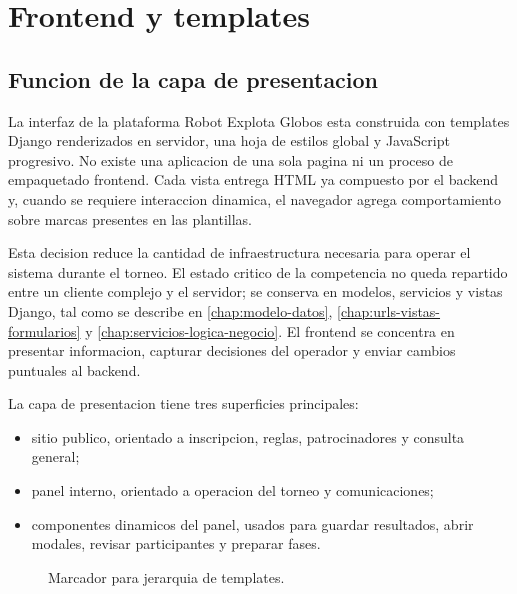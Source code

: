 \chapter{Frontend y templates}
\label{chap:frontend-templates}

\section{Funcion de la capa de presentacion}
\label{sec:frontend-funcion}

La interfaz de la plataforma Robot Explota Globos esta construida con templates Django renderizados en servidor, una hoja de estilos global y JavaScript progresivo. No existe una aplicacion de una sola pagina ni un proceso de empaquetado frontend. Cada vista entrega HTML ya compuesto por el backend y, cuando se requiere interaccion dinamica, el navegador agrega comportamiento sobre marcas  presentes en las plantillas.

Esta decision reduce la cantidad de infraestructura necesaria para operar el sistema durante el torneo. El estado critico de la competencia no queda repartido entre un cliente complejo y el servidor; se conserva en modelos, servicios y vistas Django, tal como se describe en \cref{chap:modelo-datos}, \cref{chap:urls-vistas-formularios} y \cref{chap:servicios-logica-negocio}. El frontend se concentra en presentar informacion, capturar decisiones del operador y enviar cambios puntuales al backend.

La capa de presentacion tiene tres superficies principales:

\begin{itemize}
  \item sitio publico, orientado a inscripcion, reglas, patrocinadores y consulta general;
  \item panel interno, orientado a operacion del torneo y comunicaciones;
  \item componentes dinamicos del panel, usados para guardar resultados, abrir modales, revisar participantes y preparar fases.
\end{itemize}

\begin{figure}[H]
  \centering
  \caption{Marcador para jerarquia de templates.}
  \label{fig:frontend-jerarquia-templates}
\end{figure}


